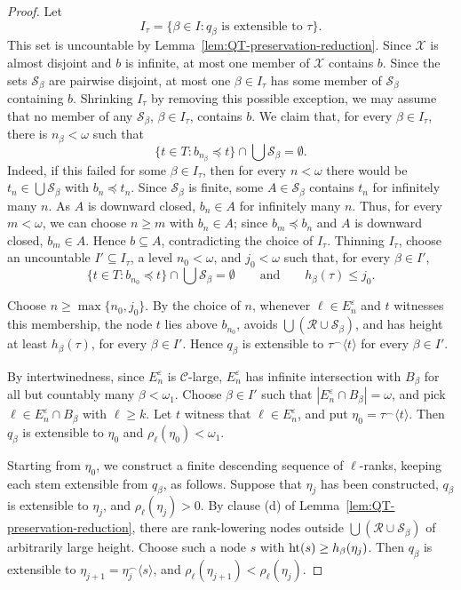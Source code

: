 \begin{proof}
Let
\[
  I_\tau=\{\beta\in I:q_\beta\text{ is extensible to }\tau\}.
\]
This set is uncountable by Lemma~\ref{lem:QT-preservation-reduction}.
Since $\mathcal X$ is almost disjoint and $b$ is infinite, at most one member of
$\mathcal X$ contains $b$.
Since the sets $\mathcal S_\beta$ are pairwise disjoint, at most one
$\beta\in I_\tau$ has some member of $\mathcal S_\beta$ containing $b$.
Shrinking $I_\tau$ by removing this possible exception, we may assume that no
member of any $\mathcal S_\beta$, $\beta\in I_\tau$, contains $b$.
We claim that, for every $\beta\in I_\tau$, there is $n_\beta<\omega$ such that
\[
  \{t\in T:b_{n_\beta}\preceq t\}\cap\bigcup\mathcal S_\beta=\emptyset.
\]
Indeed, if this failed for some $\beta\in I_\tau$, then for every
$n<\omega$ there would be $t_n\in\bigcup\mathcal S_\beta$ with
$b_n\preceq t_n$.  Since $\mathcal S_\beta$ is finite, some
$A\in\mathcal S_\beta$ contains $t_n$ for infinitely many $n$.  As $A$ is
downward closed, $b_n\in A$ for infinitely many $n$.  Thus, for every
$m<\omega$, we can choose $n\geq m$ with $b_n\in A$; since
$b_m\preceq b_n$ and $A$ is downward closed, $b_m\in A$.  Hence
$b\subseteq A$, contradicting the choice of $I_\tau$.
Thinning $I_\tau$, choose an uncountable $I'\subseteq I_\tau$, a level
$n_0<\omega$, and $j_0<\omega$ such that, for every $\beta\in I'$,
\[
  \{t\in T:b_{n_0}\preceq t\}\cap\bigcup\mathcal S_\beta=\emptyset
  \qquad\text{and}\qquad
  h_\beta(\tau)\leq j_0.
\]

Choose $n\geq\max\{n_0,j_0\}$.
By the choice of $n$, whenever $\ell\in E^\varepsilon_n$ and $t$ witnesses
this membership, the node $t$ lies above $b_{n_0}$, avoids
$\bigcup(\mathcal R\cup\mathcal S_\beta)$, and has height at least
$h_\beta(\tau)$, for every $\beta\in I'$.  Hence $q_\beta$ is extensible to
$\tau^\frown\langle t\rangle$ for every $\beta\in I'$.

By intertwinedness, since $E^\varepsilon_n$ is $\mathcal C$-large,
$E^\varepsilon_n$ has infinite intersection with
$B_\beta$ for all but countably many $\beta<\omega_1$.  Choose
$\beta\in I'$ such that $|E^\varepsilon_n\cap B_\beta|=\omega$, and pick
$\ell\in E^\varepsilon_n\cap B_\beta$ with $\ell\geq k$.  Let $t$ witness
that $\ell\in E^\varepsilon_n$, and put
$\eta_0=\tau^\frown\langle t\rangle$.  Then $q_\beta$ is extensible to
$\eta_0$ and $\rho_\ell(\eta_0)<\omega_1$.

Starting from $\eta_0$, we construct a finite descending sequence of
$\ell$-ranks, keeping each stem extensible from $q_\beta$, as follows.  Suppose that
$\eta_j$ has been constructed, $q_\beta$ is extensible to $\eta_j$, and
$\rho_\ell(\eta_j)>0$.  By clause (d) of
Lemma~\ref{lem:QT-preservation-reduction}, there are rank-lowering nodes
outside $\bigcup(\mathcal R\cup\mathcal S_\beta)$ of arbitrarily large height.
Choose such a node $s$ with $\operatorname{ht}(s)\geq h_\beta(\eta_j)$.
Then $q_\beta$ is extensible to
$\eta_{j+1}=\eta_j^\frown\langle s\rangle$, and $\rho_\ell(\eta_{j+1})<\rho_\ell(\eta_j)$.


\end{proof}
